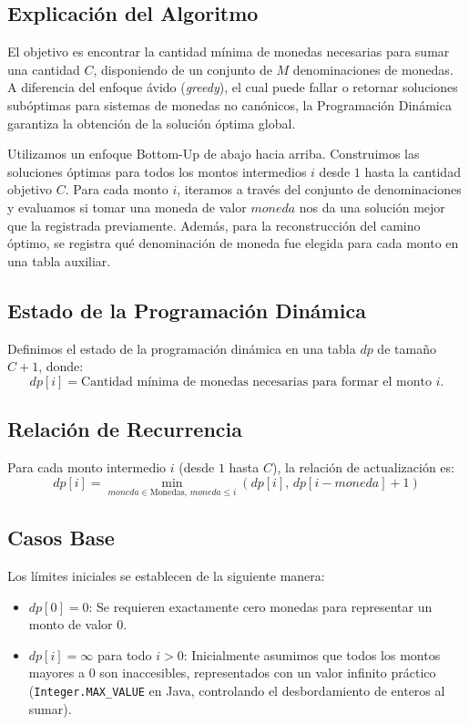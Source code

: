 \documentclass[11pt, a4paper]{article}
\begin{document}
\subsection{Explicación del Algoritmo}
El objetivo es encontrar la cantidad mínima de monedas necesarias para sumar una cantidad $C$, disponiendo de un conjunto de $M$ denominaciones de monedas. A diferencia del enfoque ávido (\textit{greedy}), el cual puede fallar o retornar soluciones subóptimas para sistemas de monedas no canónicos, la Programación Dinámica garantiza la obtención de la solución óptima global.

Utilizamos un enfoque Bottom-Up de abajo hacia arriba. Construimos las soluciones óptimas para todos los montos intermedios $i$ desde $1$ hasta la cantidad objetivo $C$. Para cada monto $i$, iteramos a través del conjunto de denominaciones y evaluamos si tomar una moneda de valor $moneda$ nos da una solución mejor que la registrada previamente. Además, para la reconstrucción del camino óptimo, se registra qué denominación de moneda fue elegida para cada monto en una tabla auxiliar.

\subsection{Estado de la Programación Dinámica}
Definimos el estado de la programación dinámica en una tabla $dp$ de tamaño $C+1$, donde:
\[
dp[i] = \text{Cantidad mínima de monedas necesarias para formar el monto } i.
\]

\subsection{Relación de Recurrencia}
Para cada monto intermedio $i$ (desde $1$ hasta $C$), la relación de actualización es:
\[
dp[i] = \min_{moneda \in \text{Monedas}, \, moneda \le i} \left( dp[i], \, dp[i - moneda] + 1 \right)
\]

\subsection{Casos Base}
Los límites iniciales se establecen de la siguiente manera:
\begin{itemize}
    \item $dp[0] = 0$: Se requieren exactamente cero monedas para representar un monto de valor $0$.
    \item $dp[i] = \infty$ para todo $i > 0$: Inicialmente asumimos que todos los montos mayores a $0$ son inaccesibles, representados con un valor infinito práctico (\texttt{Integer.MAX\_VALUE} en Java, controlando el desbordamiento de enteros al sumar).
\end{itemize}
\end{document}
